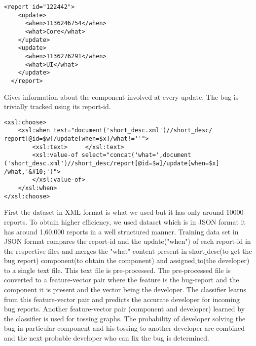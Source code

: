 \begin{verbatim}
<report id="122442">
    <update>
      <when>1136246754</when>
      <what>Core</what>
    </update>
    <update>
      <when>1136276291</when>
      <what>UI</what>
    </update>
  </report>
\end{verbatim}
Gives information about the component involved at every update.
The bug is trivially tracked using its report-id.
\newline
\lstset{language=XML}
\begin{lstlisting}
<xsl:choose>					
	<xsl:when test="document('short_desc.xml')//short_desc/
report[@id=$w]/update[when=$x]/what!=''">
		<xsl:text>     </xsl:text>					
		<xsl:value-of select="concat('what=',document
('short_desc.xml')//short_desc/report[@id=$w]/update[when=$x]
/what,'&#10;')">
		</xsl:value-of>
	</xsl:when>
</xsl:choose>
\end{lstlisting}

First the dataset in XML format is what we used but it has only around 10000 reports. To obtain higher efficiency, we used dataset which is in JSON format it has around 1,60,000 reports in a well structured manner.
Training data set in JSON format compares the report-id and the update("when") of each report-id in the respective files and merges the "what" content present in short$\_$desc(to get the bug report) component(to obtain the component) and assigned$\_$to(the developer) to a single text file. This text file is pre-processed. The pre-processed file is converted to a feature-vector pair where the feature is the bug-report and the component it is present and the vector being the developer. The classifier learns from this feature-vector pair and predicts the accurate developer for incoming bug reports. Another feature-vector pair (component and developer) learned by the classifier is used for tossing graphs. The probability of developer solving the bug in particular component and his tossing to another developer are combined and the next probable developer who can fix the bug is determined.

